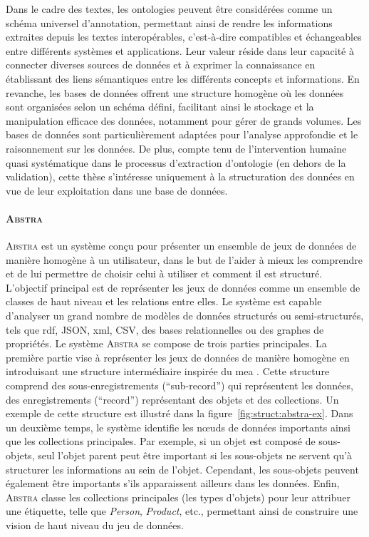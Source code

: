 Dans le cadre des textes, les ontologies peuvent être considérées comme un schéma universel d'annotation, permettant ainsi de rendre les informations extraites depuis les textes interopérables, c'est-à-dire compatibles et échangeables entre différents systèmes et applications.
Leur valeur réside dans leur capacité à connecter diverses sources de données et à exprimer la connaissance en établissant des liens sémantiques entre les différents concepts et informations.
En revanche, les bases de données offrent une structure homogène où les données sont organisées selon un schéma défini, facilitant ainsi le stockage et la manipulation efficace des données, notamment pour gérer de grands volumes.
Les bases de données sont particulièrement adaptées pour l'analyse approfondie et le raisonnement sur les données.
De plus, compte tenu de l'intervention humaine quasi systématique dans le processus d'extraction d'ontologie (en dehors de la validation), cette thèse s'intéresse uniquement à la structuration des données en vue de leur exploitation dans une base de données.

\paragraph{\textsc{Abstra}}
\textsc{Abstra} \cite{barretAbstraGenericAbstractions2022} est un système conçu pour présenter un ensemble de jeux de données de manière homogène à un utilisateur, dans le but de l'aider à mieux les comprendre et de lui permettre de choisir celui à utiliser et comment il est structuré.
L'objectif principal est de représenter les jeux de données comme un ensemble de classes de haut niveau et les relations entre elles.
Le système est capable d'analyser un grand nombre de modèles de données structurés ou semi-structurés, tels que \acrshort{rdf}, JSON, \acrshort{xml}, CSV, des bases relationnelles ou des graphes de propriétés.
Le système \textsc{Abstra} se compose de trois parties principales.
La première partie vise à représenter les jeux de données de manière homogène en introduisant une structure intermédiaire inspirée du \gls{mea} \cite{chenEntityrelationshipModelUnified1976}.
Cette structure comprend des sous-enregistrements (\enquote{sub-record}) qui représentent les données, des enregistrements (\enquote{record}) représentant des objets et des collections.
Un exemple de cette structure est illustré dans la figure~\ref{fig:struct:abstra-ex}.
Dans un deuxième temps, le système identifie les nœuds de données importants ainsi que les collections principales.
Par exemple, si un objet est composé de sous-objets, seul l'objet parent peut être important si les sous-objets ne servent qu'à structurer les informations au sein de l'objet.
Cependant, les sous-objets peuvent également être importants s'ils apparaissent ailleurs dans les données.
Enfin, \textsc{Abstra} classe les collections principales (les types d'objets) pour leur attribuer une étiquette, telle que \emph{Person}, \emph{Product}, etc., permettant ainsi de construire une vision de haut niveau du jeu de données.

